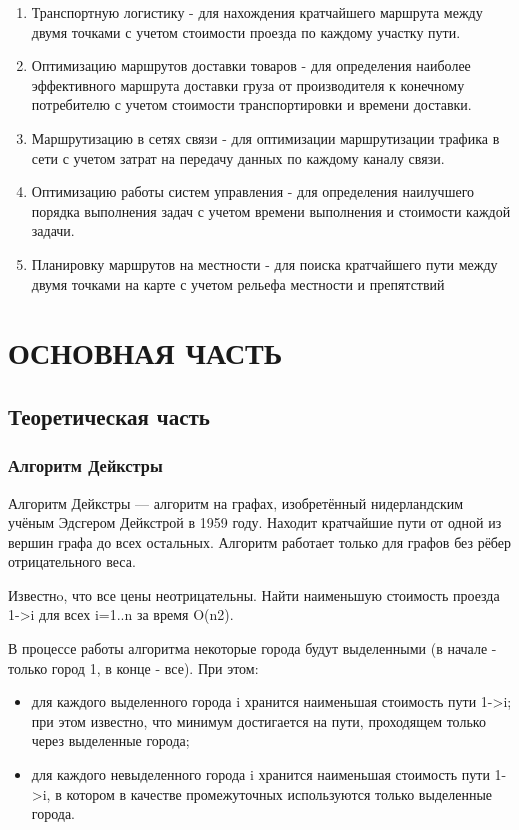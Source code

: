 \documentclass[a4paper,14pt, Times New Roman]{extarticle}
\begin{document}
\begin{enumerate}
  \item Транспортную логистику - для нахождения кратчайшего маршрута между двумя точками с учетом стоимости проезда по каждому участку пути.
  \item Оптимизацию маршрутов доставки товаров - для определения наиболее эффективного маршрута доставки груза от производителя к конечному потребителю с учетом стоимости транспортировки и времени доставки.
  \item Маршрутизацию в сетях связи - для оптимизации маршрутизации трафика в сети с учетом затрат на передачу данных по каждому каналу связи.
  \item Оптимизацию работы систем управления - для определения наилучшего порядка выполнения задач с учетом времени выполнения и стоимости каждой задачи.
  \item Планировку маршрутов на местности - для поиска кратчайшего пути между двумя точками на карте с учетом рельефа местности и препятствий
\end{enumerate}

\newpage
\section{ОСНОВНАЯ ЧАСТЬ}

\subsection{Теоретическая часть}

\subsubsection{Алгоритм Дейкстры}

Алгоритм Дейкстры — алгоритм на графах, изобретённый нидерландским учёным Эдсгером Дейкстрой в 1959 году. Находит кратчайшие пути от одной из вершин графа до всех остальных. Алгоритм работает только для графов без рёбер отрицательного веса.

Известнo, что все цены неотрицательны. Найти наименьшую стоимость проезда 1->i для всех i=1..n за время O(n2).

В процессе работы алгоритма некоторые города будут выделенными (в начале - только город 1, в конце - все). При этом:

\begin{itemize}
  \item для каждого выделенного города i хранится наименьшая стоимость пути 1->i; при этом известно, что минимум достигается на пути, проходящем только через выделенные города;
  \item для каждого невыделенного города i хранится наименьшая стоимость пути 1->i, в котором в качестве промежуточных используются только выделенные города.
\end{itemize}
\end{document}
